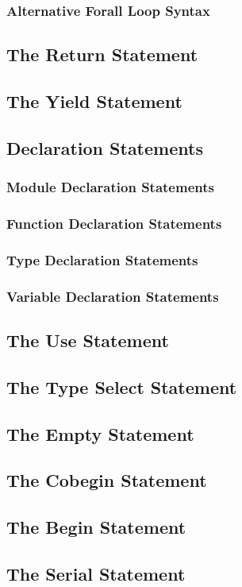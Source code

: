 \documentclass[10pt,twoside,titlepage]{article}
\begin{document}
\subsubsection{Alternative Forall Loop Syntax}
\subsection{The Return Statement}
\subsection{The Yield Statement}
\subsection{Declaration Statements}
\subsubsection{Module Declaration Statements}
\subsubsection{Function Declaration Statements}
\subsubsection{Type Declaration Statements}
\subsubsection{Variable Declaration Statements}
\subsection{The Use Statement}
\subsection{The Type Select Statement}
\subsection{The Empty Statement}
\subsection{The Cobegin Statement}
\subsection{The Begin Statement}
\subsection{The Serial Statement}
\end{document}
